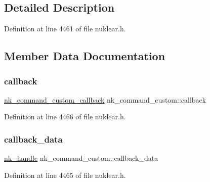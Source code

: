 \subsection{Detailed Description}


Definition at line 4461 of file nuklear.\+h.



\subsection{Member Data Documentation}
\mbox{\label{structnk__command__custom_ada2427e791d8e1d96264f9873b1d5e08}} 
\subsubsection{\texorpdfstring{callback}{callback}}
{\footnotesize\ttfamily \mbox{\hyperlink{nuklear_8h_a31909395d6066c8b4a31d1a371816a37}{nk\+\_\+command\+\_\+custom\+\_\+callback}} nk\+\_\+command\+\_\+custom\+::callback}



Definition at line 4466 of file nuklear.\+h.

\mbox{\label{structnk__command__custom_ae4d6bed7d6f565ecf799ad64e06be834}} 
\subsubsection{\texorpdfstring{callback\+\_\+data}{callback\_data}}
{\footnotesize\ttfamily \mbox{\hyperlink{unionnk__handle}{nk\+\_\+handle}} nk\+\_\+command\+\_\+custom\+::callback\+\_\+data}



Definition at line 4465 of file nuklear.\+h.

\mbox{\label{structnk__command__custom_aeeef97c98b0b23de526713fcb88fb536}} 
